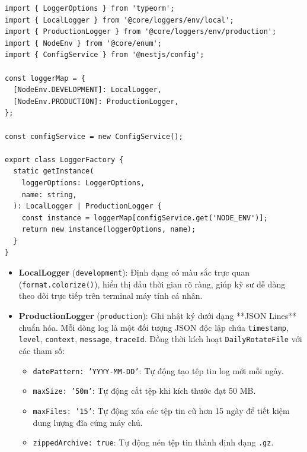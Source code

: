 \documentclass[12pt,a4paper,oneside]{book}
\begin{document}
\begin{codebox}
\begin{Verbatim}[fontsize=\small]
import { LoggerOptions } from 'typeorm';
import { LocalLogger } from '@core/loggers/env/local';
import { ProductionLogger } from '@core/loggers/env/production';
import { NodeEnv } from '@core/enum';
import { ConfigService } from '@nestjs/config';

const loggerMap = {
  [NodeEnv.DEVELOPMENT]: LocalLogger,
  [NodeEnv.PRODUCTION]: ProductionLogger,
};

const configService = new ConfigService();

export class LoggerFactory {
  static getInstance(
    loggerOptions: LoggerOptions,
    name: string,
  ): LocalLogger | ProductionLogger {
    const instance = loggerMap[configService.get('NODE_ENV')];
    return new instance(loggerOptions, name);
  }
}
\end{Verbatim}
\end{codebox}

\begin{itemize}
  \item \textbf{LocalLogger} (\texttt{development}): Định dạng có màu sắc trực quan (\texttt{format.colorize()}), hiển thị dấu thời gian rõ ràng, giúp kỹ sư dễ dàng theo dõi trực tiếp trên terminal máy tính cá nhân.
  \item \textbf{ProductionLogger} (\texttt{production}): Ghi nhật ký dưới dạng **JSON Lines** chuẩn hóa. Mỗi dòng log là một đối tượng JSON độc lập chứa \texttt{timestamp}, \texttt{level}, \texttt{context}, \texttt{message}, \texttt{traceId}. Đồng thời kích hoạt \texttt{DailyRotateFile} với các tham số:
    \begin{itemize}
      \item \texttt{datePattern: 'YYYY-MM-DD'}: Tự động tạo tệp tin log mới mỗi ngày.
      \item \texttt{maxSize: '50m'}: Tự động cắt tệp khi kích thước đạt 50 MB.
      \item \texttt{maxFiles: '15'}: Tự động xóa các tệp tin cũ hơn 15 ngày để tiết kiệm dung lượng đĩa cứng máy chủ.
      \item \texttt{zippedArchive: true}: Tự động nén tệp tin thành định dạng \texttt{.gz}.
    \end{itemize}
\end{itemize}
\end{document}

